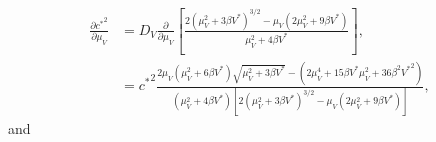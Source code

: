 \documentclass{jpmarticle}
\begin{document}
\begin{equation}
  \begin{split}
    \frac{\partial {c^*}^2}{\partial \mu_V}
    &=
    D_V
    \frac{\partial}{\partial \mu_V} \left[
      \frac{2 \left(\mu_V^2 + 3 \beta V^*\right)^{3/2}
        - \mu_V \left(2 \mu_V^2 + 9 \beta V^*\right)}
      {\mu_V^2 + 4 \beta V^*}
    \right],
    \\
    &=
    {c^*}^2
    \frac{
      2 \mu_V \left(\mu_V^2 + 6 \beta V^*\right)
      \sqrt{\mu_V^2 + 3 \beta V^*}
      - \left(
        2 \mu_V^4
        + 15 \beta V^* \mu_V^2
        + 36 \beta^2 {V^*}^2
      \right)
    }
    {\left(\mu_V^2 + 4 \beta V^*\right)
    \left[2 \left(\mu_V^2 + 3 \beta V^*\right)^{3/2}
        - \mu_V \left(2 \mu_V^2 + 9 \beta V^*\right)\right]},
  \end{split}
\end{equation}
and
\end{document}
